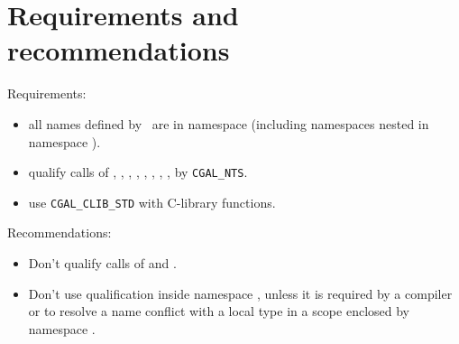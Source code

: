 \section{Requirements and recommendations}

Requirements:
\begin{itemize}
\item all names defined by \cgal\ are in namespace  (including
      namespaces nested in namespace ).
\item qualify calls of  , , ,
      , , , ,
      ,  by \texttt{CGAL\_NTS}.
\item use \texttt{CGAL\_CLIB\_STD} with C-library functions.
\end{itemize}

Recommendations:
\begin{itemize}
\item Don't qualify calls of  and .
\item Don't use  qualification inside namespace ,%
unless it is required by a compiler or to resolve a name conflict with a
local type in a scope enclosed by namespace .
\end{itemize}
